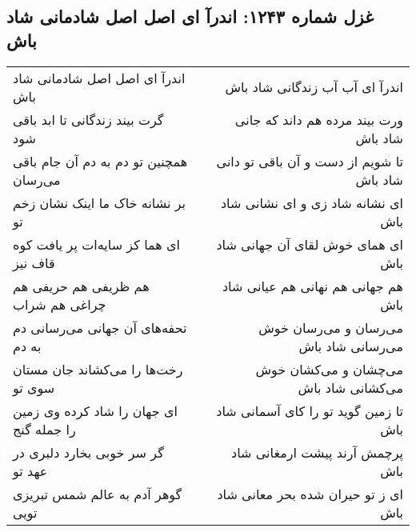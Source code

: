 \begin{center}
\section*{غزل شماره ۱۲۴۳: اندرآ ای اصل اصل شادمانی شاد باش}
\label{sec:1243}
\begin{longtable}{l p{0.5cm} r}
اندرآ ای اصل اصل شادمانی شاد باش
&&
اندرآ ای آب آب زندگانی شاد باش
\\
گرت بیند زندگانی تا ابد باقی شود
&&
ورت بیند مرده هم داند که جانی شاد باش
\\
همچنین تو دم به دم آن جام باقی می‌رسان
&&
تا شویم از دست و آن باقی تو دانی شاد باش
\\
بر نشانه خاک ما اینک نشان زخم تو
&&
ای نشانه شاد زی و ای نشانی شاد باش
\\
ای هما کز سایه‌ات پر یافت کوه قاف نیز
&&
ای همای خوش لقای آن جهانی شاد باش
\\
هم ظریفی هم حریفی هم چراغی هم شراب
&&
هم جهانی هم نهانی هم عیانی شاد باش
\\
تحفه‌های آن جهانی می‌رسانی دم به دم
&&
می‌رسان و می‌رسان خوش می‌رسانی شاد باش
\\
رخت‌ها را می‌کشاند جان مستان سوی تو
&&
می‌چشان و می‌کشان خوش می‌کشانی شاد باش
\\
ای جهان را شاد کرده وی زمین را جمله گنج
&&
تا زمین گوید تو را کای آسمانی شاد باش
\\
گر سر خوبی بخارد دلبری در عهد تو
&&
پرچمش آرند پیشت ارمغانی شاد باش
\\
گوهر آدم به عالم شمس تبریزی تویی
&&
ای ز تو حیران شده بحر معانی شاد باش
\\
\end{longtable}
\end{center}
